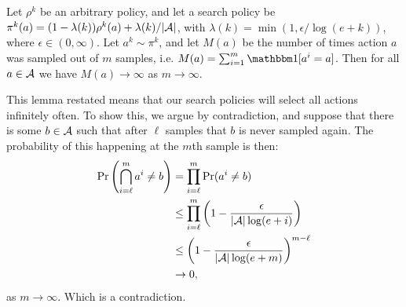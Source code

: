 










    \begin{lemma} \label{oldlem:inf_often_action_select}
        Let $\rho^k$ be an arbitrary policy, and let a search policy be $\pi^k(a)=(1-\lambda(k))\rho^k(a) + \lambda(k) / |\mathcal{A}|$, with $\lambda(k)=\min(1,\epsilon/\log(e+k))$, where $\epsilon\in(0,\infty)$. Let $a^k\sim \pi^k$, and let $M(a)$ be the number of times action $a$ was sampled out of $m$ samples, i.e. $M(a)=\sum_{i=1}^m \one[a^i=a]$. Then for all $a\in\mathcal{A}$ we have $M(a)\rightarrow\infty$ as $m\rightarrow \infty$.
    \end{lemma}
    \begin{proofoutline}
        This lemma restated means that our search policies will select all actions infinitely often. To show this, we argue by contradiction, and suppose that there is some $b\in\mathcal{A}$ such that after $\ell$ samples that $b$ is never sampled again. The probability of this happening at the $m$th sample is then:
        \begin{align}
            \Pr\left(\bigcap_{i=\ell}^m a^i \neq b \right)
                &= \prod_{i=\ell}^m \Pr(a^i \neq b) \\
                &\leq \prod_{i=\ell}^m \left( 1 - \frac{\epsilon}{|\mathcal{A}|\log(e+i)} \right) \\
                &\leq \left( 1 - \frac{\epsilon}{|\mathcal{A}|\log(e+m)} \right)^{m-\ell} \\
                &\rightarrow 0,
        \end{align}
        as $m\rightarrow\infty$. Which is a contradiction. 
    \end{proofoutline}







